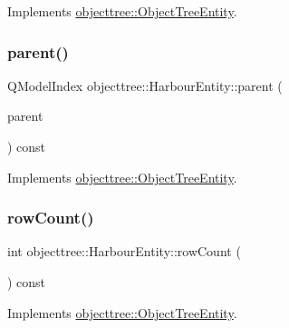 Implements \mbox{\hyperlink{classobjecttree_1_1_object_tree_entity_a9ccaab3b27e65b1ed8b22f00c57a1082}{objecttree\+::\+Object\+Tree\+Entity}}.

\mbox{\label{classobjecttree_1_1_harbour_entity_ab778a458c3da89ac66399c724b5626eb}} 
\subsubsection{\texorpdfstring{parent()}{parent()}}
{\footnotesize\ttfamily Q\+Model\+Index objecttree\+::\+Harbour\+Entity\+::parent (\begin{DoxyParamCaption}\item[{const Q\+Model\+Index \&}]{parent }\end{DoxyParamCaption}) const\hspace{0.3cm}{\ttfamily [virtual]}}



Implements \mbox{\hyperlink{classobjecttree_1_1_object_tree_entity_a2d1b13c056476f87637aacd7e99e7305}{objecttree\+::\+Object\+Tree\+Entity}}.

\mbox{\label{classobjecttree_1_1_harbour_entity_a7573679069c91cd1ecf631052952253f}} 
\subsubsection{\texorpdfstring{rowCount()}{rowCount()}}
{\footnotesize\ttfamily int objecttree\+::\+Harbour\+Entity\+::row\+Count (\begin{DoxyParamCaption}{ }\end{DoxyParamCaption}) const\hspace{0.3cm}{\ttfamily [virtual]}}



Implements \mbox{\hyperlink{classobjecttree_1_1_object_tree_entity_a82c626bb28c55dcfce11cf7ec3368588}{objecttree\+::\+Object\+Tree\+Entity}}.

\mbox{\label{classobjecttree_1_1_harbour_entity_adaa8cebd8e3b69c4cfed614a5b81fdfd}} 
